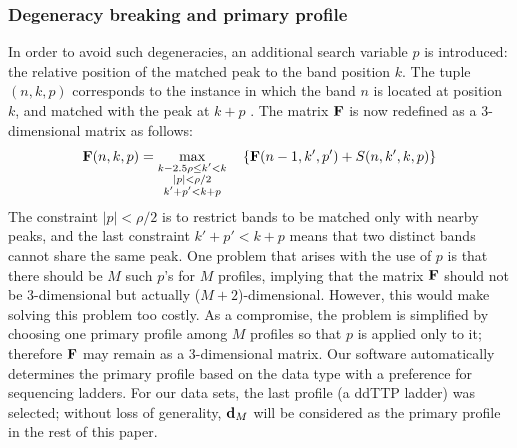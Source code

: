 \subsubsection{Degeneracy breaking and primary profile}\label{sss:primary_profile}
  In order to avoid such degeneracies, an additional search variable $p$ is introduced: the relative position of the matched peak to the band position $k$. The tuple $(n,k,p)$ corresponds to the instance in which the band $n$ is located at position $k$, and matched with the peak at $k+p$ . The matrix ${\mathbf{F}}$ is now redefined as a 3-dimensional matrix as follows:
%
\begin{equation}\label{e:F2}
{\mathbf{F}}(n,k,p) = \max_{\substack{k-2.5\rho \le k' < k\\|p| < \rho/2\\k'+p' < k+p}}\quad \left\{ {\mathbf{F}}(n-1,k',p') + S(n,k',k,p) \right\}
\end{equation}
%
The constraint $|p| < \rho/2$ is to restrict bands to be matched only with nearby peaks, and the last constraint $k'+p'<k+p$ means that two distinct bands cannot share the same peak. One problem that arises with the use of $p$ is that there should be $M$ such $p$'s for $M$ profiles, implying that the matrix ${\mathbf{F}}$ should not be 3-dimensional but actually ($M+2$)-dimensional. However, this would make solving this problem too costly. As a compromise, the problem is simplified by choosing one primary profile among $M$ profiles so that $p$ is applied only to it; therefore ${\mathbf{F}}$ may remain as a 3-dimensional matrix. Our software automatically determines the primary profile based on the data type with a preference for sequencing ladders. For our data sets, the last profile (a ddTTP ladder) was selected; without loss of generality, ${\mathbf{d}}_M$ will be considered as the primary profile in the rest of this paper.

